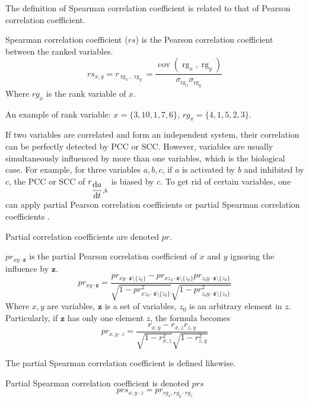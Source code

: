 The definition of Spearman correlation coefficient is related to that of Pearson correlation coefficient.

\begin{definition}
    Spearman correlation coefficient ($rs$) is the Pearson correlation coefficient between the ranked variables.
    $${\displaystyle rs_{x,y}=r_{\operatorname {rg} _{x},\operatorname {rg} _{y}}={\frac {\operatorname {cov} (\operatorname {rg} _{x},\operatorname {rg} _{y})}{\sigma _{\operatorname {rg} _{x}}\sigma _{\operatorname {rg} _{y}}}}}$$
    Where $rg_x$ is the rank variable of $x$.
\end{definition}
An example of rank variable:
$x=\{3,10,1,7,6\}$, $rg_x=\{4,1,5,2,3\}$.

If two variables are correlated and form an independent system, their correlation can be perfectly detected by PCC or SCC.
However, variables are usually simultaneously influenced by more than one variables, which is the biological case.
For example, for three variables $a,b,c$, if $a$ is activated by $b$ and inhibited by $c$, the PCC or SCC of $r_{\dfrac{{\rm d}a}{{\rm d}t},b}$ is biased by $c$. 
To get rid of certain variables, one can apply partial Pearson correlation coefficients \cite{baba2004partial} or partial Spearman correlation coefficients \cite{borror2001practical}.

Partial correlation coefficients are denoted $pr$.

\begin{definition}
    $pr_{xy\cdot \mathbf {z}}$ is the partial Pearson correlation coefficient of $x$ and $y$ ignoring the influence by $\mathbf {z}$.
    $$pr _{xy\cdot \mathbf {z} }={\frac {pr _{xy\cdot \mathbf {z} \setminus \{z_{0}\}}-pr _{xz_{0}\cdot \mathbf {z} \setminus \{z_{0}\}}pr _{z_{0}y\cdot \mathbf {z} \setminus \{z_{0}\}}}{{\sqrt {1-pr _{xz_{0}\cdot \mathbf {z} \setminus \{z_{0}\}}^{2}}}{\sqrt {1-pr _{z_{0}y\cdot \mathbf {z} \setminus \{z_{0}\}}^{2}}}}}$$
    Where $x,y$ are variables, $\mathbf {z}$ is a set of variables, $z_0$ is an arbitrary element in $z$. 
    Particularly, if $\mathbf {z}$ has only one element $z$, the formula becomes
    $$pr_{x,y\cdot z}={\frac {r _{x,y}-r _{x,z}r _{z,y}}{{\sqrt {1-r _{x,z}^{2}}}{\sqrt {1-r _{z,y}^{2}}}}}$$

\end{definition}

The partial Spearman correlation coefficient is defined likewise.
\begin{definition}Partial Spearman correlation coefficient is denoted $prs$
    $$prs_{x,y\cdot z}=pr_{rg_x,rg_y\cdot rg_z}$$%
\end{definition}

